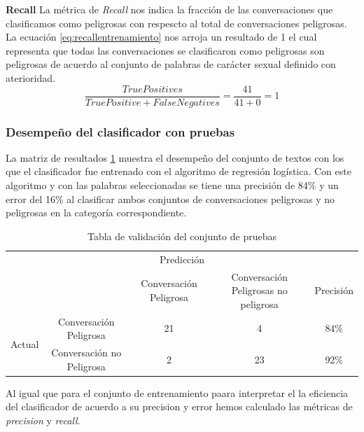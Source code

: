 \textbf{Recall} \linebreak
La m\'etrica de \textit{Recall} nos indica la fracci\'on de las conversaciones que clasificamos como peligrosas con respescto al total de conversaciones peligrosas. La ecuaci\'on \ref{eq:recallentrenamiento} nos arroja un resultado de 1 el cual representa que todas las conversaciones se clasificaron como peligrosas son peligrosas de acuerdo al conjunto de palabras de car\'acter sexual definido con aterioridad.
\begin{equation}\label{eq:recallentrenamiento}
\frac{TruePositives}{TruePositive + FalseNegatives} = \frac{41}{41+
0} = 1
\end{equation}

\subsubsection{Desempe\~no del clasificador con pruebas}

La matriz de resultados \ref{tab:confucion3} muestra el desempe\~no del conjunto de textos con los que el clasificador fue entrenado con el algoritmo de regresi\'on log\'istica. Con este algoritmo y con las palabras seleccionadas se tiene una precisi\'on de 84\% y un error del 16\% al clasificar ambos conjuntos de conversaciones peligrosas y no peligrosas en la categor\'ia correspondiente. 

\begin{table}[h]
\begin{center}
\begin{tabular}{c|c|c|c|c|}
\multicolumn{5}{c}{Predicci\'on} \\
\cline{2-5}
& & Conversaci\'on Peligrosa & Conversaci\'on Peligrosas no peligrosa&  Precisi\'on \\
\cline{2-5}
\multirow{2}{*}{Actual} & Conversaci\'on Peligrosa & 21 & 4 & 84\% \\
\cline{2-5}
& Conversaci\'on no  Peligrosa &  2 & 23 & 92\% \\
\cline{2-5}

\end{tabular}
\caption{Tabla de validaci\'on del conjunto de pruebas}
\label{tab:confucion3}
\end{center}
\end{table}



Al igual que para el conjunto de entrenamiento paara interpretar el la eficiencia del clasificador de acuerdo a su precision y error hemos calculado las m\'etricas de \textit{precision} y \textit{recall}.


